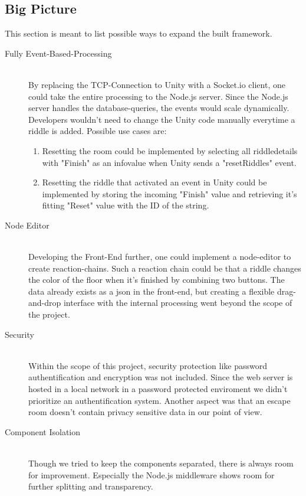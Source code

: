\subsection{Big Picture}
This section is meant to list possible ways to expand the built framework.
\begin{description}
    \item [Fully Event-Based-Processing]\hfill \\ 
    By replacing the TCP-Connection to Unity with a Socket.io client, 
    one could take the entire processing to the Node.js server. 
    Since the Node.js server handles the database-queries,
    the events would scale dynamically. 
    Developers wouldn't need to change the Unity code manually everytime a riddle is added. 
    Possible use cases are:
    \begin{enumerate}
        \item Resetting the room could be implemented by selecting all riddledetails with "Finish" as an infovalue when Unity sends a "resetRiddles" event.
        \item 
        Resetting the riddle that activated an event in Unity could be implemented by storing the incoming "Finish" 
        value and retrieving it's fitting "Reset" value with the ID of the string.
    \end{enumerate}
    \item [Node Editor]\hfill \\
    Developing the Front-End further, one could implement a node-editor to create reaction-chains. 
    Such a reaction chain could be that a riddle changes the color of the floor when it's finished by combining two buttons. 
    The data already exists as a json in the front-end, but creating a flexible drag-and-drop interface with the internal processing 
    went beyond the scope of the project. 
    \item [Security] \hfill \\
    Within the scope of this project, security protection like password authentification and encryption was not included.
    Since the web server is hosted in a local network in a password protected enviroment we didn't prioritize an authentification system.
    Another aspect was that an escape room doesn't contain privacy sensitive data in our point of view.
    \item [Component Isolation]\hfill \\
    Though we tried to keep the components separated, there is always room for improvement. 
    Especially the Node.js middleware shows room for further splitting and transparency.

\end{description}
